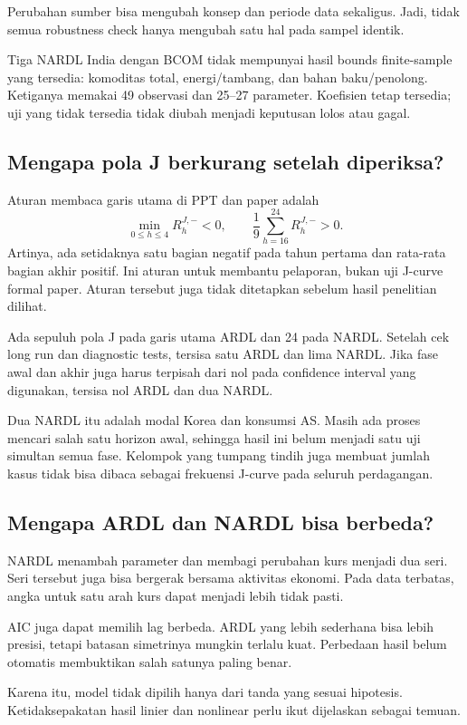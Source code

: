 Perubahan sumber bisa mengubah konsep dan periode data sekaligus. Jadi, tidak semua robustness check hanya mengubah satu hal pada sampel identik.

Tiga NARDL India dengan BCOM tidak mempunyai hasil bounds finite-sample yang tersedia: komoditas total, energi/tambang, dan bahan baku/penolong. Ketiganya memakai 49 observasi dan 25--27 parameter. Koefisien tetap tersedia; uji yang tidak tersedia tidak diubah menjadi keputusan lolos atau gagal.

\subsection{Mengapa pola J berkurang setelah diperiksa?}
Aturan membaca garis utama di PPT dan paper adalah
\begin{equation}
 \min_{0\le h\le4}R_h^{J,-}<0,\qquad
 \frac{1}{9}\sum_{h=16}^{24}R_h^{J,-}>0.\label{eq:jvisual}
\end{equation}
Artinya, ada setidaknya satu bagian negatif pada tahun pertama dan rata-rata bagian akhir positif. Ini aturan untuk membantu pelaporan, bukan uji J-curve formal paper. Aturan tersebut juga tidak ditetapkan sebelum hasil penelitian dilihat.

\begin{table}[!htbp]\centering\caption{Pola J sebelum dan sesudah pemeriksaan tambahan}
\label{tab:j}
\end{table}

Ada sepuluh pola J pada garis utama ARDL dan 24 pada NARDL. Setelah cek long run dan diagnostic tests, tersisa satu ARDL dan lima NARDL. Jika fase awal dan akhir juga harus terpisah dari nol pada confidence interval yang digunakan, tersisa nol ARDL dan dua NARDL.

Dua NARDL itu adalah modal Korea dan konsumsi AS. Masih ada proses mencari salah satu horizon awal, sehingga hasil ini belum menjadi satu uji simultan semua fase. Kelompok yang tumpang tindih juga membuat jumlah kasus tidak bisa dibaca sebagai frekuensi J-curve pada seluruh perdagangan.

\subsection{Mengapa ARDL dan NARDL bisa berbeda?}
NARDL menambah parameter dan membagi perubahan kurs menjadi dua seri. Seri tersebut juga bisa bergerak bersama aktivitas ekonomi. Pada data terbatas, angka untuk satu arah kurs dapat menjadi lebih tidak pasti.

AIC juga dapat memilih lag berbeda. ARDL yang lebih sederhana bisa lebih presisi, tetapi batasan simetrinya mungkin terlalu kuat. Perbedaan hasil belum otomatis membuktikan salah satunya paling benar.

Karena itu, model tidak dipilih hanya dari tanda yang sesuai hipotesis. Ketidaksepakatan hasil linier dan nonlinear perlu ikut dijelaskan sebagai temuan.
